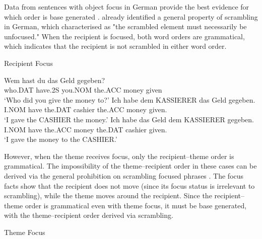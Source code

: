 Data from sentences with object focus in German provide the best evidence for which order is base generated \citep{Lenerz.1977,Abraham.1986,Webelhuth.1992,Choi.1996}. \cite{Lenerz.1977} already identified a general property of scrambling in German, which \cite{Webelhuth.1992}	 characterised as "the scrambled element must necessarily be unfocused." When the recipient is focused, both word orders are grammatical, which indicates that the recipient is not scrambled in either word order.
\begin{exe}
\ex Recipient Focus \citep[ex 12]{Choi.1996}
\begin{xlist}
\ex \gll Wem hast du das Geld gegeben?\\
who.DAT have.2S you.NOM the.ACC money given\\
\trans `Who did you give the money to?'
\ex \gll Ich habe dem KASSIERER das Geld gegeben.\\
I.NOM have the.DAT cashier the.ACC money given.\\
\trans `I gave the CASHIER the money.'
\ex \gll Ich habe das Geld dem KASSIERER gegeben.\\
I.NOM have the.ACC money the.DAT cashier given.\\
\trans `I gave the money to the CASHIER.'
\end{xlist}
\end{exe}

However, when the theme receives focus, only the recipient--theme order is grammatical. The impossibility of the theme--recipient order in these cases can be derived via the general prohibition on scrambling focused phrases \citep{Choi.1996}. The focus facts show that the recipient does not move (since its focus status is irrelevant to scrambling), while the theme moves around the recipient. Since the recipient--theme order is grammatical even with theme focus, it must be base generated, with the theme--recipient order derived via scrambling.

\begin{exe}
\ex\label{ex:gerfocus} Theme Focus \citep[ex 13]{Choi.1996}
\begin{xlist}
\end{xlist}
\end{exe}

